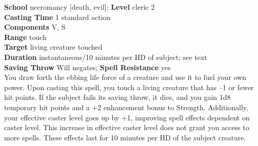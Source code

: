 \textbf{School} necromancy [death, evil]; \textbf{Level} cleric 2\\
\textbf{Casting Time} 1 standard action\\
\textbf{Components }V, S\\
\textbf{Range} touch\\
\textbf{Target} living creature touched\\
\textbf{Duration} instantaneous/10 minutes per HD of subject; see text\\
\textbf{Saving Throw }Will negates; \textbf{Spell Resistance} yes\\
You draw forth the ebbing life force of a creature and use it to fuel your own power. Upon casting this spell, you touch a living creature that has –1 or fewer hit points. If the subject fails its saving throw, it dies, and you gain 1d8 temporary hit points and a +2 enhancement bonus to Strength. Additionally, your effective caster level goes up by +1, improving spell effects dependent on caster level. This increase in effective caster level does not grant you access to more spells. These effects last for 10 minutes per HD of the subject creature.\\
